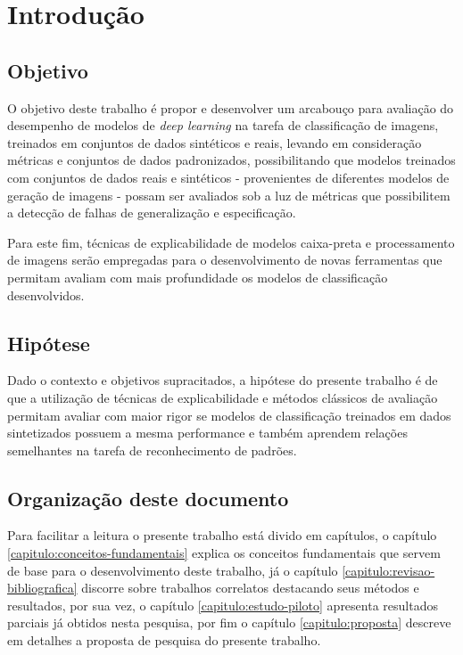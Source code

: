 \chapter{Introdução}



\section{Objetivo}

O objetivo deste trabalho é propor e desenvolver um arcabouço para avaliação do desempenho de modelos de \textit{deep learning} na tarefa de classificação de imagens, treinados em conjuntos de dados sintéticos e reais, levando em consideração métricas e conjuntos de dados padronizados, possibilitando que modelos treinados com conjuntos de dados reais e sintéticos - provenientes de diferentes modelos de geração de imagens - possam ser avaliados sob a luz de métricas que possibilitem a detecção de falhas de generalização e especificação.

Para este fim, técnicas de explicabilidade de modelos caixa-preta e processamento de imagens serão empregadas para o desenvolvimento de novas ferramentas que permitam avaliam com mais profundidade os modelos de classificação desenvolvidos.

\section{Hipótese}

Dado o contexto e objetivos supracitados, a hipótese do presente trabalho é de que a utilização de técnicas de explicabilidade e métodos clássicos de avaliação permitam avaliar com maior rigor se modelos de classificação treinados em dados sintetizados possuem a mesma performance e também aprendem relações semelhantes na tarefa de reconhecimento de padrões.

\section{Organização deste documento}

Para facilitar a leitura o presente trabalho está divido em capítulos, o capítulo \ref{capitulo:conceitos-fundamentais} explica os conceitos fundamentais que servem de base para o desenvolvimento deste trabalho, já o capítulo \ref{capitulo:revisao-bibliografica} discorre sobre trabalhos correlatos destacando seus métodos e resultados, por sua vez, o capítulo \ref{capitulo:estudo-piloto} apresenta resultados parciais já obtidos nesta pesquisa, por fim o capítulo \ref{capitulo:proposta} descreve em detalhes a proposta de pesquisa do presente trabalho.